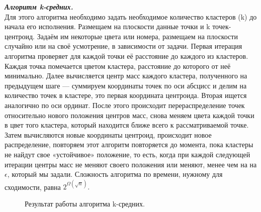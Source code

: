 \documentclass[12pt, a4paper]{article}
\begin{document}
\textit{\textbf{Алгоритм k-средних.}}\\Для этого алгоритма необходимо задать необходимое количество кластеров (k) до начала его исполнения. Размещаем на плоскости данные точки и k точек-центроид. Задаём им некоторые цвета или номера, размещаем на плоскости случайно или на своё усмотрение, в зависимости от задачи. Первая итерация алгоритма проверяет для каждой точки её расстояние до каждого из кластеров. Каждая точка помечается цветом кластера, расстояние до которого от неё минимально. Далее вычисляется центр масс каждого кластера, полученного на предыдущем шаге --- суммируем координаты точек по оси абсцисс и делим на количество точек в кластере, это первая координата центроида. Вторая ищется аналогично по оси ординат. После этого происходит перераспределение точек относительно нового положения центров масс, снова меняем цвета каждой точки в цвет того кластера, который находится ближе всего к рассматриваемой точке. Затем вычисляются новые координаты центроид, происходит новое распределение, повторяем этот алгоритм повторяется до момента, пока кластеры не найдут свое «устойчивое» положение, то есть, когда при каждой следующей итерации центры масс не меняют своего положения или меняют, менее чем на на $\epsilon$, который мы задали. Сложность алгоритма по времени, нужному для сходимости, равна $2^{\Omega(\sqrt{n})}.$
\begin{figure}[h!]
\caption{Результат работы алгоритма k-средних.}
\label{fig:k}
\end{figure}
\medskip 
 \medskip 
  \medskip 
   \medskip 
   
\end{document}
